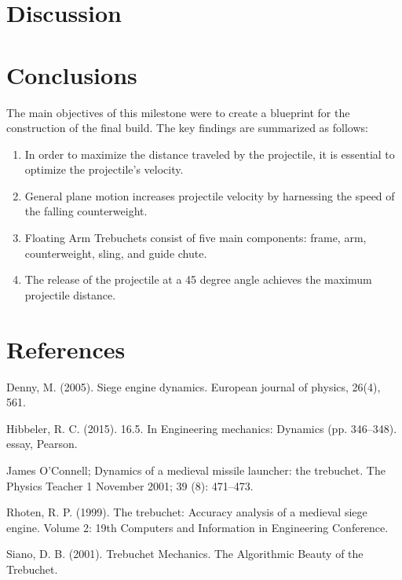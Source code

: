 \documentclass[12pt, titlepage]{article}
\begin{document}
    \section{Discussion}
    \newpage
    \section{Conclusions}
    The main objectives of this milestone were to create a blueprint for 
    the construction of the final build.
    The key findings are summarized as follows:
    \begin{enumerate}
        \item In order to maximize the distance traveled by the projectile, it is essential to optimize the projectile's velocity. 
        \item General plane motion increases projectile velocity by harnessing the speed of the falling counterweight.    
        \item Floating Arm Trebuchets consist of five main components: 
            frame, arm, counterweight, sling, and guide chute.
        \item The release of the projectile at a 45 degree angle achieves the 
            maximum projectile distance.
    \end{enumerate}
    \newpage
    \section{References}
        \hspace{15pt}Denny, M. (2005). Siege engine dynamics. European journal of physics, 26(4), 561.

        Hibbeler, R. C. (2015). 16.5. In Engineering mechanics: Dynamics (pp. 346–348). essay, Pearson.
        
        James O'Connell; Dynamics of a medieval missile launcher: the trebuchet. The Physics Teacher 1 November 2001; 39 (8): 471–473.

        Rhoten, R. P. (1999). The trebuchet: Accuracy analysis of a medieval siege engine. Volume 2: 19th Computers and Information in Engineering Conference.

        Siano, D. B. (2001). Trebuchet Mechanics. The Algorithmic Beauty of the Trebuchet.
\end{document}
